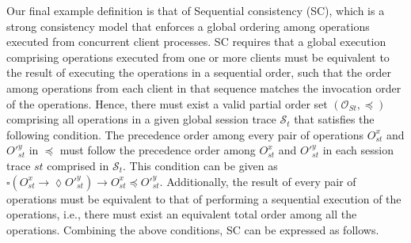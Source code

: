 \documentclass[journal, compsoc]{IEEEtran}
\begin{document}
	Our final example definition is that of Sequential consistency (SC), which is a strong consistency model that enforces a global ordering among operations executed from concurrent client processes. SC requires that a global execution comprising operations executed from one or more clients must be equivalent to the result of executing the operations in a sequential order, such that the order among operations from each client in that sequence matches the invocation order of the operations.  Hence, there must exist a valid partial order set $\left( {\mathcal{O}_{St}}, \preccurlyeq \right)$ comprising all operations in a given global session trace $\mathcal{S}_t$ that satisfies the following condition. The precedence order among every pair of operations $O^{x}_\mathit{st} $ and $O'^{y}_\mathit{st} $ in  $ \preccurlyeq$ must follow the  precedence order among $O^{x}_\mathit{st} $ and $O'^{y}_\mathit{st} $ in each session trace $\mathit{st}$ comprised in  $\mathcal{S}_t$.  This condition can be given as $\square \left( O_\mathit{st}^x \rightarrow \lozenge O'^{y}_\mathit{st}  \right)
	\rightarrow O_\mathit{st}^x \preccurlyeq O'^{y}_\mathit{st}$. Additionally, the result of every pair of operations must be equivalent to that of performing a sequential execution of the operations, i.e., there must exist an equivalent total order among all the operations. Combining the above conditions, SC can be expressed as follows.
\end{document}

